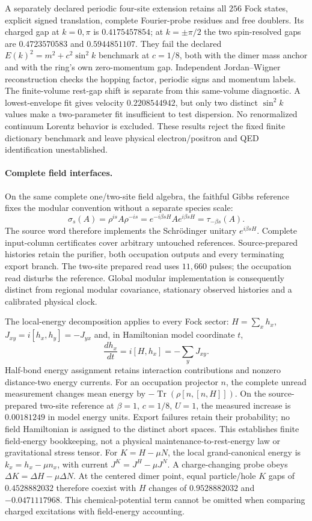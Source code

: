 A separately declared periodic four-site extension retains all $256$ Fock
states, explicit signed translation, complete Fourier-probe residues and
free doublers. Its charged gap at $k=0,\pi$ is $0.4175457854$; at
$k=\pm\pi/2$ the two spin-resolved gaps are $0.4723570583$ and
$0.5944851107$. They fail the declared
$E(k)^2=m^2+c^2\sin^2 k$ benchmark at $c=1/8$, both with the dimer mass
anchor and with the ring's own zero-momentum gap. Independent
Jordan--Wigner reconstruction checks the hopping factor, periodic signs
and momentum labels. The finite-volume rest-gap shift is separate from
this same-volume diagnostic. A lowest-envelope fit gives velocity
$0.2208544942$, but only two distinct $\sin^2 k$ values make a two-parameter
fit insufficient to test dispersion. No renormalized continuum Lorentz
behavior is excluded. These results reject the fixed finite dictionary
benchmark and leave physical electron/positron and QED identification
unestablished.

\paragraph{Complete field interfaces.}
On the same complete one/two-site field algebra, the faithful Gibbs
reference fixes the modular convention without a separate species scale:
\[
 \sigma_s(A)=\rho^{is}A\rho^{-is}
 =e^{-i\beta sH}Ae^{i\beta sH}=\tau_{-\beta s}(A).
\]
The source word therefore implements the Schr\"odinger unitary
$e^{i\beta sH}$. Complete input-column certificates cover arbitrary
untouched references. Source-prepared histories retain the purifier,
both occupation outputs and every terminating export branch. The
two-site prepared read uses $11{,}660$ pulses; the occupation read
disturbs the reference. Global modular implementation is consequently
distinct from regional modular covariance, stationary observed histories
and a calibrated physical clock.

The local-energy decomposition applies to every Fock sector:
$H=\sum_x h_x$, $J_{xy}=i[h_x,h_y]=-J_{yx}$ and, in Hamiltonian
model coordinate $t$,
\[
 \frac{dh_x}{dt}=i[H,h_x]=-\sum_y J_{xy}.
\]
Half-bond energy assignment retains interaction contributions and
nonzero distance-two energy currents. For an occupation projector $n$,
the complete unread measurement changes mean energy by
$-\operatorname{Tr}(\rho[n,[n,H]])$. On the source-prepared two-site
reference at $\beta=1$, $c=1/8$, $U=1$, the measured increase is
$0.00181249$ in model energy units. Export failures retain their
probability; no field Hamiltonian is assigned to the distinct abort
spaces. This establishes finite field-energy bookkeeping, not a
physical maintenance-to-rest-energy law or gravitational stress tensor.
For $K=H-\mu N$, the local grand-canonical energy is
$k_x=h_x-\mu n_x$, with current $J^K=J^H-\mu J^N$.
A charge-changing probe obeys $\Delta K=\Delta H-\mu\Delta N$.
At the centered dimer point, equal particle/hole $K$ gaps of
$0.4528882032$ therefore coexist with $H$ changes of $0.9528882032$
and $-0.0471117968$. This chemical-potential term cannot be omitted
when comparing charged excitations with field-energy accounting.

